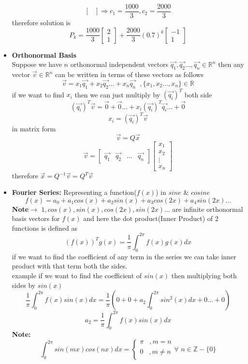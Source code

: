 \documentclass[a4paper,11pt]{article}
\numberwithin{equation}{section}
\begin{document}
\begin{itemize}
\[\begin{bmatrix}
\end{bmatrix} \Longrightarrow c_1=\frac{1000}{3},c_2=\frac{2000}{3}
\]
therefore solution is
\[
    P_k=\frac{1000}{3}\begin{bmatrix}
        2\\1
    \end{bmatrix}+\frac{2000}{3}(0.7)^k\begin{bmatrix}
        -1\\1
    \end{bmatrix}
\]
\item \textbf{Orthonormal Basis}\\
Suppose we have $n$ orthonormal independent vectors $\vec{q_1},\vec{q_2}\dots,\vec{q_n} \in \mathbb{R}^n$ then any vector $\vec{v} \in \mathbb{R}^n$ can be written in terms of these vectors as follows
\[
\vec{v}=x_1\vec{q_1}+x_2\vec{q_2}\dots +x_n\vec{q_n} \hspace{7pt}, \{x_1,x_2\dots,x_n\}\in \mathbb{R}
\]
if we want to find $x_i$ then we can just multiply by $(\vec{q_i})^T$ both side
\[
(\vec{q_i})^T\vec{v}=\vec{0}+\vec{0}\dots+x_i(\vec{q_i})^T\vec{q_i}\dots+\vec{0}
\]
\[
x_i=(\vec{q_i})^T\vec{v}
\]
in matrix form 
\[
\vec{v}=Q\vec{x}
\]
\[
\vec{v}=\begin{bmatrix}\vec{q_1}&\vec{q_2}&\dots&\vec{q_n} \end{bmatrix}\begin{bmatrix}
    x_1\\x_2\\\vdots\\x_n
\end{bmatrix}
\]
therefore $\vec{x}=Q^{-1}\vec{v}=Q^T\vec{v}$

\item \textbf{Fourier Series: } Representing a function($f(x)$) in $sine$ \& $cosine$
\begin{equation}
    f(x)=a_0+a_1cos(x)+a_2sin(x)+a_3cos(2x)+a_4sin(2x)\dots \tag{Fourier}
\end{equation}
\textbf{Note}$\rightarrow$ $1,cos(x),sin(x),cos(2x),sin(2x)\dots$ are infinite orthonormal basis vectors for $f(x)$ and here the dot product(Inner Product) of 2 functions is defined as
\[
(f(x))^Tg(x)=\frac{1}{\pi}\int_{0}^{2\pi}f(x)g(x)dx
\]
if we want to find the coefficient of any term in the series we can take inner product with that term both the sides.\\

example if we want to find the coefficient of $sin(x)$ then multiplying both sides by $sin(x)$
\[
\frac{1}{\pi}\int_{0}^{2\pi}f(x)sin(x)dx=\frac{1}{\pi}\left(0+0+a_2\int_{0}^{2\pi}sin^2(x)dx+0\dots+0\right)
\]
\[
a_2=\frac{1}{\pi}\int_{0}^{2\pi}f(x)sin(x)dx
\]
\textbf{Note: }
\[  \int_{0}^{2\pi}sin(mx)cos(nx)dx=
    \begin{cases}
        \pi \hspace{10pt} ,m=n\\
        0 \hspace{10pt} ,m\neq n\\
    \end{cases} \forall \hspace{4pt}n \in \mathbb{Z}-\{0\}
\]


\end{itemize}
\end{document}
